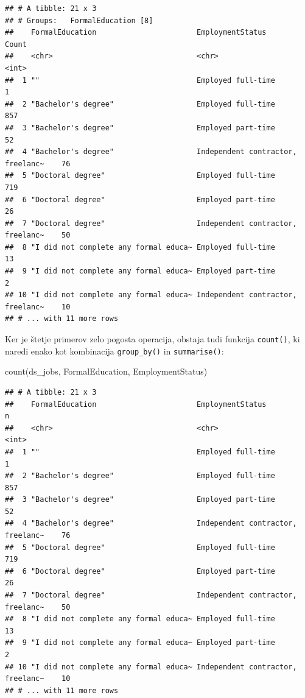 \documentclass[
]{book}
\newenvironment{Shaded}{\begin{snugshade}}{\end{snugshade}}
\newcommand{\FunctionTok}[1]{\textcolor[rgb]{0.00,0.00,0.00}{#1}}
\newcommand{\NormalTok}[1]{#1}
\begin{document}
\begin{verbatim}
## # A tibble: 21 x 3
## # Groups:   FormalEducation [8]
##    FormalEducation                       EmploymentStatus                  Count
##    <chr>                                 <chr>                             <int>
##  1 ""                                    Employed full-time                    1
##  2 "Bachelor's degree"                   Employed full-time                  857
##  3 "Bachelor's degree"                   Employed part-time                   52
##  4 "Bachelor's degree"                   Independent contractor, freelanc~    76
##  5 "Doctoral degree"                     Employed full-time                  719
##  6 "Doctoral degree"                     Employed part-time                   26
##  7 "Doctoral degree"                     Independent contractor, freelanc~    50
##  8 "I did not complete any formal educa~ Employed full-time                   13
##  9 "I did not complete any formal educa~ Employed part-time                    2
## 10 "I did not complete any formal educa~ Independent contractor, freelanc~    10
## # ... with 11 more rows
\end{verbatim}

Ker je štetje primerov zelo pogosta operacija, obstaja tudi funkcija \texttt{count()}, ki naredi enako kot kombinacija \texttt{group\_by()} in \texttt{summarise()}:

\begin{Shaded}
\begin{Highlighting}[]
\FunctionTok{count}\NormalTok{(ds\_jobs, FormalEducation, EmploymentStatus)}
\end{Highlighting}
\end{Shaded}

\begin{verbatim}
## # A tibble: 21 x 3
##    FormalEducation                       EmploymentStatus                      n
##    <chr>                                 <chr>                             <int>
##  1 ""                                    Employed full-time                    1
##  2 "Bachelor's degree"                   Employed full-time                  857
##  3 "Bachelor's degree"                   Employed part-time                   52
##  4 "Bachelor's degree"                   Independent contractor, freelanc~    76
##  5 "Doctoral degree"                     Employed full-time                  719
##  6 "Doctoral degree"                     Employed part-time                   26
##  7 "Doctoral degree"                     Independent contractor, freelanc~    50
##  8 "I did not complete any formal educa~ Employed full-time                   13
##  9 "I did not complete any formal educa~ Employed part-time                    2
## 10 "I did not complete any formal educa~ Independent contractor, freelanc~    10
## # ... with 11 more rows
\end{verbatim}
\end{document}
